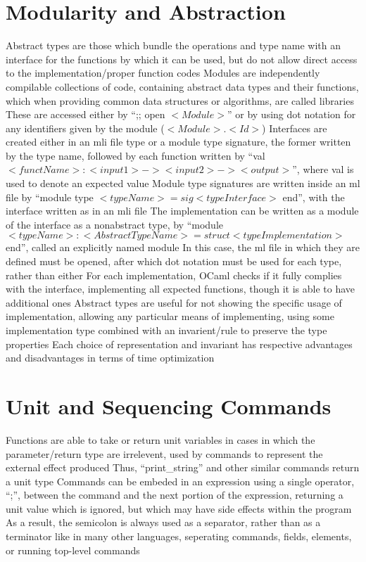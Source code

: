 \documentclass[11 pt, twoside]{article}
\newenvironment{outline*}
{
	\begin{outline}[enumerate]
	}
	{\end{outline}
}
\begin{document}
\section{Modularity and Abstraction}
\begin{outline*}
\1 Abstract types are those which bundle the operations and type name with an interface for the functions by which it can be used, but do not allow direct access to the implementation/proper function codes
	\2 Modules are independently compilable collections of code, containing abstract data types and their functions, which when providing common data structures or algorithms, are called libraries
		\3 These are accessed either by ``;; open $<Module>$'' or by using dot notation for any identifiers given by the module ($<Module>.<Id>$)
	\2 Interfaces are created either in an mli file type or a module type signature, the former written by the type name, followed by each function written by ``val $<functName> : <input1> -> <input2> -> <output>$'', where val is used to denote an expected value
		\3 Module type signatures are written inside an ml file by ``module type $<typeName> = sig <typeInterface>$ end'', with the interface written as in an mli file
		\3 The implementation can be written as a module of the interface as a nonabstract type, by ``module $<typeName> : <AbstractTypeName> = struct <typeImplementation>$ end'', called an explicitly named module
			\4 In this case, the ml file in which they are defined must be opened, after which dot notation must be used for each type, rather than either
	\2 For each implementation, OCaml checks if it fully complies with the interface, implementing all expected functions, though it is able to have additional ones
\1 Abstract types are useful for not showing the specific usage of implementation, allowing any particular means of implementing, using some implementation type combined with an invarient/rule to preserve the type properties
	\2 Each choice of representation and invariant has respective advantages and disadvantages in terms of time optimization
\end{outline*}
\section{Unit and Sequencing Commands}
\begin{outline*}
\1 Functions are able to take or return unit variables in cases in which the parameter/return type are irrelevent, used by commands to represent the external effect produced
	\2 Thus, ``print\_string'' and other similar commands return a unit type
\1 Commands can be embeded in an expression using a single operator, ``;'', between the command and the next portion of the expression, returning a unit value which is ignored, but which may have side effects within the program
	\2 As a result, the semicolon is always used as a separator, rather than as a terminator like in many other languages, seperating commands, fields, elements, or running top-level commands
\end{outline*}
\end{document}
